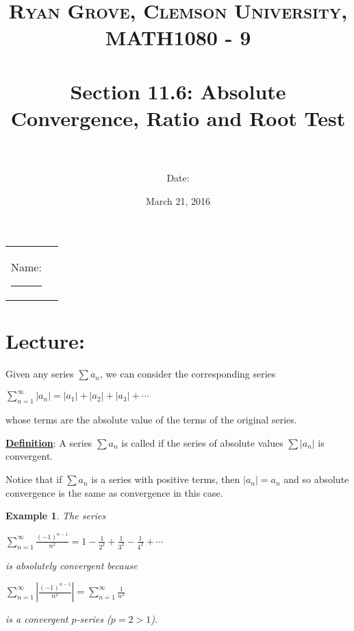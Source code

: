 \documentclass[paper=a4, fontsize=11pt]{scrartcl} %
\title{	
\normalfont \normalsize 
\textsc{Ryan Grove, Clemson University, MATH1080 - 9} \\ [25pt] %
\horrule{0.5pt} \\[0.4cm] %
\huge Section 11.6: Absolute Convergence, Ratio and Root Test\\ %
\horrule{2pt} \\[0.5cm] %
}
\author{Date:} %
\date{\normalsize March 21, 2016} %
\numberwithin{equation}{section} %
\numberwithin{figure}{section} %
\numberwithin{table}{section} %
\newtheorem{example}{Example}
\newcommand{\ds}{\displaystyle}
\newcommand{\enter}{\vspace{5mm}}
\newcommand{\senter}{\vspace{3mm}}
\begin{document}
\maketitle %

\begin{flushleft}
\begin{tabular}{l l}
Name: \rule{3.2in}{.01cm}  & {}%
\end{tabular}
\end{flushleft}


\section*{\textbf{Lecture:}}
\vspace{8mm}


\enter

\noindent Given any series $\ds\sum a_n$, we can consider the corresponding series

\senter

\begin{center}
$\ds\sum_{n=1}^{\infty}|a_n|=|a_1|+|a_2|+|a_3|+\cdots$
\end{center}

\senter

\noindent whose terms are the absolute value of the terms of the original series.

\begin{framed}
\noindent\underline{\textbf{Definition}}: A series $\ds\sum a_n$ is called \underline{\hphantom{aaabsolutelyaa}} \text{} \underline{\hphantom{aaconvergentaa}} if the series of absolute values $\ds\sum|a_n|$ is convergent.
\end{framed}

\enter

\noindent Notice that if $\ds\sum a_n$ is a series with positive terms, then $|a_n|=a_n$ and so absolute convergence is the same as convergence in this case.

\begin{example}
The series

\begin{center}
$\ds\sum_{n=1}^{\infty}\frac{(-1)^{n-1}}{n^2}=1-\frac{1}{2^2}+\frac{1}{3^2}-\frac{1}{4^2}+\cdots$
\end{center}

\senter

\noindent is absolutely convergent because

\begin{center}
$\ds\sum_{n=1}^{\infty}\left|\frac{(-1)^{n-1}}{n^2}\right|=\sum_{n=1}^{\infty}\frac{1}{n^2}$
\end{center}

\senter

\noindent is a convergent $p$-series ($p=2>1$).
\end{example}
\end{document}
